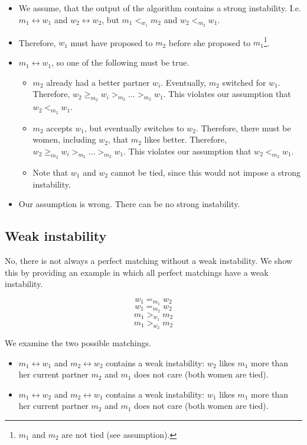 \documentclass[12pt]{article}
\begin{document}
\begin{itemize}
	\item We assume, that the output of the algorithm contains a strong instability. I.e. $m_1 \leftrightarrow w_1$ and $w_2 \leftrightarrow w_2$, but $m_1 <_{w_1} m_2$ and $w_2 <_{m_2} w_1$.
	\item Therefore, $w_1$ must have proposed to $m_2$ before she proposed to $m_1$\footnote{$m_1$ and $m_2$ are not tied (see assumption).}.
	\item $m_1 \leftrightarrow w_1$, so one of the following must be true. \begin{itemize}
		\item $m_2$ already had a better partner $w_i$. Eventually, $m_2$ switched for $w_1$. Therefore, $w_2 \geq_{m_2} w_i >_{m_2} \ldots >_{m_2} w_1$. This violates our assumption that $w_2 <_{m_2} w_1$.
	\item $m_2$ accepts $w_1$, but eventually switches to $w_2$. Therefore, there must be women, including $w_2$, that $m_2$ likes better. Therefore, $w_2 \geq_{m_2} w_i >_{m_2} \ldots >_{m_2} w_1$. This violates our assumption that $w_2 <_{m_2} w_1$.
	\item Note that $w_1$ and $w_2$ cannot be tied, since this would not impose a strong instability.
	\end{itemize}
	\item Our assumption is wrong. There can be no strong instability.
\end{itemize}

\subsection*{Weak instability}
No, there is not always a perfect matching without a weak instability. We show this by providing an example in which all perfect matchings have a weak instability.

$$ w_1 =_{m_1} w_2 $$
$$ w_1 =_{m_2} w_2 $$
$$ m_1 >_{w_1} m_2 $$
$$ m_1 >_{w_2} m_2 $$

We examine the two possible matchings.

\begin{itemize}
	\item $m_1 \leftrightarrow w_1$ and $m_2 \leftrightarrow w_2$ contains a weak instability: $w_2$ likes $m_1$ more than her current partner $m_2$ and $m_1$ does not care (both women are tied).
	\item $m_1 \leftrightarrow w_2$ and $m_2 \leftrightarrow w_1$ contains a weak instability: $w_1$ likes $m_1$ more than her current partner $m_2$ and $m_1$ does not care (both women are tied).
\end{itemize}
\end{document}
